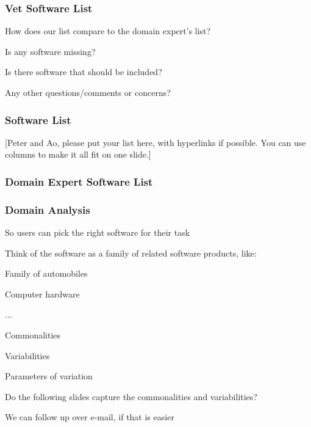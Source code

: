 \documentclass[t,12pt,numbers,fleqn]{beamer}
\begin{document}

\begin{frame}
\frametitle{Vet Software List}

\bi
\item How does our list compare to the domain expert's list?
\item Is any software missing?
\item Is there software that should be included?
\item Any other questions/comments or concerns?  
\ei
  
\end{frame}


\begin{frame}
\frametitle{Software List}

[Peter and Ao, please put your list here, with hyperlinks if possible.  You can use
columns to make it all fit on one slide.]

\end{frame}


\begin{frame}
\frametitle{Domain Expert Software List}


\end{frame}


\begin{frame}
\frametitle{Domain Analysis}

\bi
\item So users can pick the right software for their task
\item Think of the software as a family of related software products, like:
\bi
\item Family of automobiles
\item Computer hardware
\item ...
\ei
\item Commonalities
\item Variabilities
\item Parameters of variation
\item Do the following slides capture the commonalities and variabilities?
\item We can follow up over e-mail, if that is easier
\ei

\end{frame}
\end{document}
